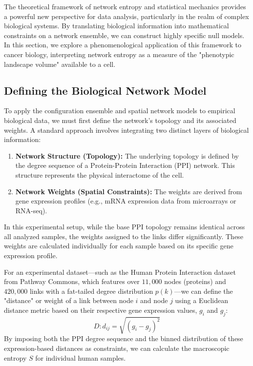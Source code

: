 The theoretical framework of network entropy and statistical mechanics provides a powerful new perspective for data analysis, particularly in the realm of complex biological systems. By translating biological information into mathematical constraints on a network ensemble, we can construct highly specific null models. In this section, we explore a phenomenological application of this framework to cancer biology, interpreting network entropy as a measure of the "phenotypic landscape volume" available to a cell.

\subsection{Defining the Biological Network Model}
\label{subsec:biological_network_model}

To apply the configuration ensemble and spatial network models to empirical biological data, we must first define the network's topology and its associated weights. A standard approach involves integrating two distinct layers of biological information:
\begin{enumerate}
    \item \textbf{Network Structure (Topology):} The underlying topology is defined by the degree sequence of a Protein-Protein Interaction (PPI) network. This structure represents the physical interactome of the cell.
    \item \textbf{Network Weights (Spatial Constraints):} The weights are derived from gene expression profiles (e.g., mRNA expression data from microarrays or RNA-seq).
\end{enumerate}

In this experimental setup, while the base PPI topology remains identical across all analyzed samples, the weights assigned to the links differ significantly. These weights are calculated individually for each sample based on its specific gene expression profile.

For an experimental dataset—such as the Human Protein Interaction dataset from Pathway Commons, which features over \(11,000\) nodes (proteins) and \(420,000\) links with a fat-tailed degree distribution \(p(k)\)—we can define the "distance" or weight of a link between node \(i\) and node \(j\) using a Euclidean distance metric based on their respective gene expression values, \(g_i\) and \(g_j\):
\[
    D: d_{ij} = \sqrt{(g_i - g_j)^2}
\]
By imposing both the PPI degree sequence and the binned distribution of these expression-based distances as constraints, we can calculate the macroscopic entropy \(S\) for individual human samples.

